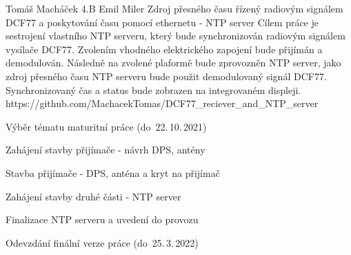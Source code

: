 \documentclass{assignment}
\begin{document}
\PrintForm
    {Tomáš Macháček} %
    {4.B} %
    {Emil Miler} %
    {Zdroj přesného času řízený radiovým signálem DCF77 a poskytování času pomocí ethernetu - NTP server} %
    { %
        Cílem práce je sestrojení vlastního NTP serveru, který bude synchronizován radiovým signálem vysílače DCF77. Zvolením vhodného elektrického zapojení bude přijímán a demodulován. Následně na zvolené plaformě bude zprovozněn NTP server, jako zdroj přesného času NTP serveru bude použit demodulovaný signál DCF77. Synchronizovaný čas a status bude zobrazen na integrovaném displeji.
	}
	{}
    {https://github.com/MachacekTomas/DCF77_reciever_and_NTP_server} %

\PrintSchedule
    {  %
        \item Výběr tématu maturitní práce (do~22.\,10.\,2021)
    }
    { %
        \item Zahájení stavby přijímače - návrh DPS, antény
    }
    { %
        \item Stavba přijímače - DPS, anténa a kryt na přijímač
    }
    { %
        \item Zahájení stavby druhé části - NTP server
    }
    { %
        \item Finalizace NTP serveru a uvedení do provozu
    }
    { %
        \item Odevzdání finální verze práce (do~25.\,3.\,2022)
    }
\end{document}
